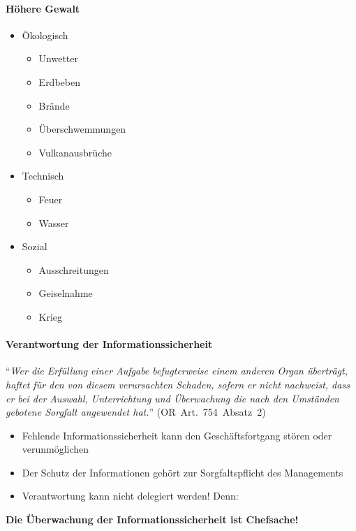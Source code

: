 \documentclass[10pt,a4paper]{article}
\begin{document}
\paragraph*{Höhere Gewalt}
\begin{itemize}[noitemsep,topsep=0pt,leftmargin=*]
    \item Ökologisch
    \begin{itemize}[noitemsep,topsep=0pt,leftmargin=*]
        \item Unwetter
        \item Erdbeben
        \item Brände
        \item Überschwemmungen
        \item Vulkanausbrüche
    \end{itemize}
    \item Technisch
    \begin{itemize}[noitemsep,topsep=0pt,leftmargin=*]
        \item Feuer
        \item Wasser
    \end{itemize}
    \item Sozial
    \begin{itemize}[noitemsep,topsep=0pt,leftmargin=*]
        \item Ausschreitungen
        \item Geiselnahme
        \item Krieg
    \end{itemize}
\end{itemize}

\paragraph*{Verantwortung der Informationssicherheit}"`\textsl{Wer die Erfüllung einer Aufgabe befugterweise einem anderen Organ überträgt, haftet für den von diesem verursachten Schaden, sofern er nicht nachweist, dass er bei der Auswahl, Unterrichtung und Überwachung die nach den Umständen gebotene Sorgfalt angewendet hat.}"' (OR~Art.~754~Absatz~2)

\begin{itemize}[noitemsep,topsep=0pt,leftmargin=*]
    \item Fehlende Informationssicherheit kann den Geschäftsfortgang stören oder verunmöglichen
    \item Der Schutz der Informationen gehört zur Sorgfaltspflicht des Managements
    \item Verantwortung kann nicht delegiert werden! Denn:
\end{itemize}
\textsf{\textbf{\large{Die Überwachung der Informationssicherheit ist Chefsache!}}}
\end{document}
